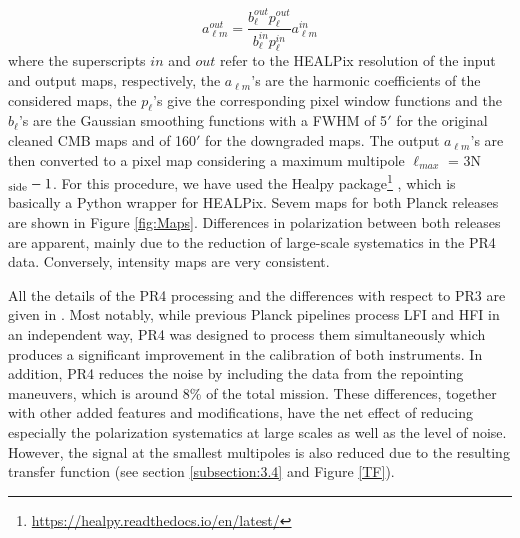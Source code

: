 %
\begin{equation}\label{smoothing}
    a_{\ell m}^{out} = \frac{b_{\ell}^{out}p_{\ell}^{out}}{b_{\ell}^{in}p_{\ell}^{in}}a_{\ell m}^{in}
\end{equation}
%
where the superscripts $in$ and $out$ refer to the HEALPix resolution of the input and output maps, respectively, the $a_{\ell m}$'s are the harmonic coefficients of the considered maps, the $p_{\ell}$'s give the corresponding pixel window functions and the $b_{\ell}$'s are the Gaussian smoothing functions with a FWHM of 5$'$ for the original cleaned CMB maps and of 160$'$ for the downgraded maps. The output $a_{\ell m}$'s are then converted to a pixel map considering a maximum multipole $\ell_{max}$ = 3N$_{\rm side}-1$. For this procedure, we have used the Healpy package\footnote{\url{https://healpy.readthedocs.io/en/latest/}} \cite{Zonca2019}, which is basically a Python wrapper for HEALPix. Sevem maps for both
Planck releases
are shown in Figure \ref{fig:Maps}. Differences in polarization between both releases are apparent, mainly due to the reduction of large-scale systematics in the PR4 data. Conversely, intensity maps are very consistent.

All the details of the PR4 processing and the differences 
with respect to PR3
are given in \cite{Planck:2020olo}.
Most notably, while previous Planck pipelines process LFI and HFI in an independent way, PR4 was designed to process them simultaneously which produces a significant improvement in the calibration of both instruments. In addition, PR4 reduces the noise by including the data from the repointing maneuvers, which is around 8\% of the total mission. These differences, together with other added features and modifications,
have the net effect of reducing 
especially 
the polarization systematics at large scales 
as well as the level of noise. However, the signal at the smallest multipoles is also reduced due to the resulting transfer function (see section \ref{subsection:3.4} and Figure \ref{TF}).


